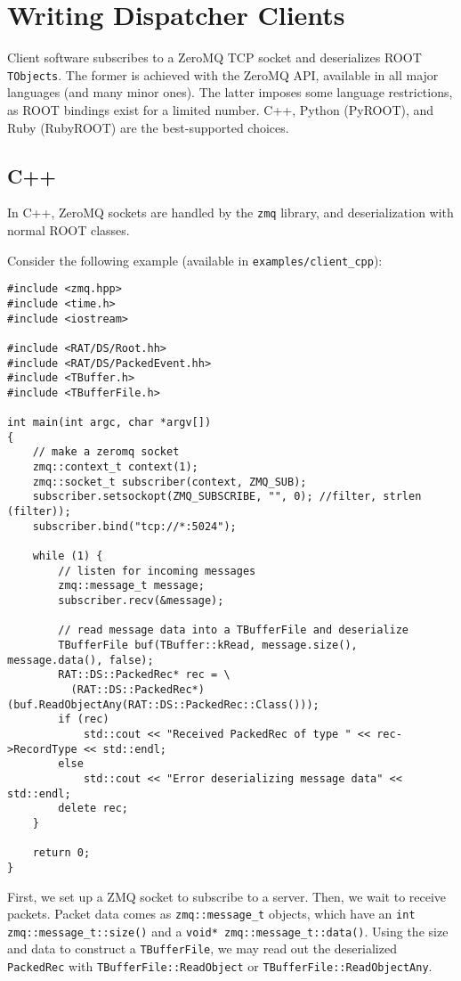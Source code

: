 \documentclass{article}
\begin{document}
\section{Writing Dispatcher Clients}
Client software subscribes to a ZeroMQ TCP socket and deserializes ROOT {\tt TObjects}. The former is achieved with the ZeroMQ API, available in all major languages (and many minor ones). The latter imposes some language restrictions, as ROOT bindings exist for a limited number. C++, Python (PyROOT), and Ruby (RubyROOT) are the best-supported choices.
\subsection{C++}
In C++, ZeroMQ sockets are handled by the {\tt zmq} library, and deserialization with normal ROOT classes.

Consider the following example (available in {\tt examples/client\_cpp}):

\begin{verbatim}
#include <zmq.hpp>
#include <time.h>
#include <iostream>

#include <RAT/DS/Root.hh>
#include <RAT/DS/PackedEvent.hh>
#include <TBuffer.h>
#include <TBufferFile.h>

int main(int argc, char *argv[])
{
    // make a zeromq socket
    zmq::context_t context(1);
    zmq::socket_t subscriber(context, ZMQ_SUB);
    subscriber.setsockopt(ZMQ_SUBSCRIBE, "", 0); //filter, strlen (filter));
    subscriber.bind("tcp://*:5024");

    while (1) {
        // listen for incoming messages
        zmq::message_t message;
        subscriber.recv(&message);

        // read message data into a TBufferFile and deserialize
        TBufferFile buf(TBuffer::kRead, message.size(), message.data(), false);
        RAT::DS::PackedRec* rec = \
          (RAT::DS::PackedRec*)(buf.ReadObjectAny(RAT::DS::PackedRec::Class()));
        if (rec)
            std::cout << "Received PackedRec of type " << rec->RecordType << std::endl;
        else
            std::cout << "Error deserializing message data" << std::endl;
        delete rec;
    }

    return 0;
}
\end{verbatim}

First, we set up a ZMQ socket to subscribe to a server. Then, we wait to receive packets. Packet data comes as {\tt zmq::message\_t} objects, which have an {\tt int zmq::message\_t::size()} and a {\tt void* zmq::message\_t::data()}. Using the size and data to construct a {\tt TBufferFile}, we may read out the deserialized {\tt PackedRec} with {\tt TBufferFile::ReadObject} or {\tt TBufferFile::ReadObjectAny}.
\end{document}
